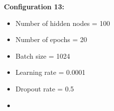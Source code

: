 \documentclass[12pt,oneside]{book} %
\begin{document}
\noindent \textbf{Configuration 13:}
\begin{multicols}{2}
    \begin{itemize}
        \item Number of hidden nodes = 100
        \item Number of epochs = 20
        \item Batch size = 1024
    \end{itemize}
    \begin{itemize}
         \item Learning rate = 0.0001
         \item Dropout rate  = 0.5
         \item[\hspace{0pt}]
    \end{itemize}
\end{multicols}
\end{document}
